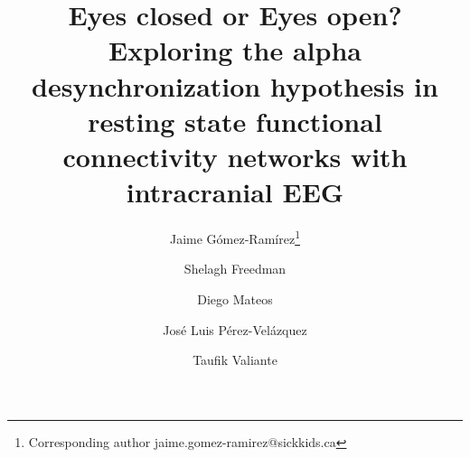 \documentclass[11pt, onecolumn]{article}
\begin{document}
\def\mean#1{\left< #1 \right>}

\title{Eyes closed or Eyes open? Exploring the alpha desynchronization hypothesis in  resting state functional connectivity networks with intracranial EEG}
\author[1]{Jaime G{\'o}mez-Ram{\'i}rez\thanks{Corresponding author \hspace{0.6cm} jaime.gomez-ramirez@sickkids.ca}}
\author[2]{Shelagh Freedman}%
\author[1]{Diego Mateos}
\author[1]{Jos{\'e} Luis P{\'e}rez-Vel{\'a}zquez}
\author[3]{Taufik Valiante}
\date{}

\maketitle
\end{document}
